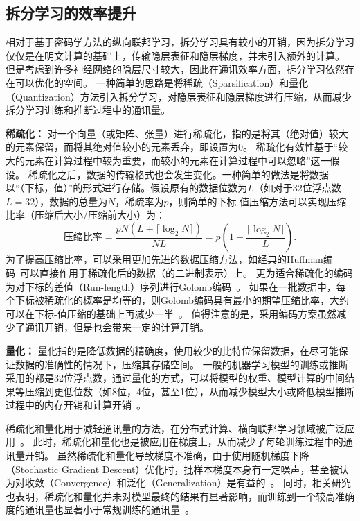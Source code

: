 \subsection{拆分学习的效率提升}
相对于基于密码学方法的纵向联邦学习，拆分学习具有较小的开销，因为拆分学习仅仅是在明文计算的基础上，传输隐层表征和隐层梯度，并未引入额外的计算。
%
但是考虑到许多神经网络的隐层尺寸较大，因此在通讯效率方面，拆分学习依然存在可以优化的空间。
%
一种简单的思路是将稀疏（Sparsification）和量化（Quantization）方法引入拆分学习，对隐层表征和隐层梯度进行压缩，从而减少拆分学习训练和推断过程中的通讯量。
%

\textbf{稀疏化：}
对一个向量（或矩阵、张量）进行稀疏化，指的是将其（绝对值）较大的元素保留，而将其绝对值较小的元素丢弃，即设置为0。
%
稀疏化有效性基于“较大的元素在计算过程中较为重要，而较小的元素在计算过程中可以忽略”这一假设。
%
稀疏化之后，数据的传输格式也会发生变化。一种简单的做法是将数据以“（下标，值）”的形式进行存储。假设原有的数据位数为$L$（如对于32位浮点数$L=32$），数据的总量为$N$，稀疏率为$p$，则简单的下标-值压缩方法可以实现压缩比率（压缩后大小/压缩前大小）为：
\begin{equation}
    \text{压缩比率}=\dfrac{pN(L + \lceil \log_2N \rceil)}{NL} = p(1 + \dfrac{\lceil \log_2N \rceil}{L}).
\end{equation}
为了提高压缩比率，可以采用更加先进的数据压缩方法，如经典的Huffman编码~\cite{huffman1952}可以直接作用于稀疏化后的数据（的二进制表示）上。
%
更为适合稀疏化的编码为对下标的差值（Run-length）序列进行Golomb编码~\cite{gallager1975golomb}。
%
如果在一批数据中，每个下标被稀疏化的概率是均等的，则Golomb编码具有最小的期望压缩比率，大约可以在下标-值压缩的基础上再减少一半~\cite{sattler2019sparse_binary}。
%
值得注意的是，采用编码方案虽然减少了通讯开销，但是也会带来一定的计算开销。


\textbf{量化：}
量化指的是降低数据的精确度，使用较少的比特位保留数据，在尽可能保证数据的准确性的情况下，压缩其存储空间。
%
一般的机器学习模型的训练或推断采用的都是32位浮点数，通过量化的方式，可以将模型的权重、模型计算的中间结果等压缩到更低位数（如8位，4位，甚至1位），从而减少模型大小或降低模型推断过程中的内存开销和计算开销~\cite{zhou2016dorefa,banner2018_8bit,yang2019quantization}。




稀疏化和量化用于减轻通讯量的方法，在分布式计算、横向联邦学习领域被广泛应用~\cite{wen2017terngrad,sattler2019sparse_binary}。
%
此时，稀疏化和量化也是被应用在梯度上，从而减少了每轮训练过程中的通讯量开销。
%
虽然稀疏化和量化导致梯度不准确，由于使用随机梯度下降（Stochastic Gradient Descent）优化时，批样本梯度本身有一定噪声，甚至被认为对收敛（Convergence）和泛化（Generalization）是有益的~\cite{hardt2016sgd,goyal2017sgd_imagenet,chaudhari2018sgd}。
%
同时，相关研究也表明，稀疏化和量化并未对模型最终的结果有显著影响，而训练到一个较高准确度的通讯量也显著小于常规训练的通讯量~\cite{aji2017sparse,sattler2019sparse_binary,wen2017terngrad}。

